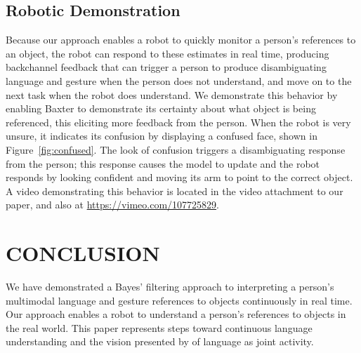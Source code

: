 \documentclass[graybox]{svmult}
\begin{document}
\subsection{Robotic Demonstration}

Because our approach enables a robot to quickly monitor a person's
references to an object, the robot can respond to these estimates in
real time, producing backchannel feedback that can trigger a person to
produce disambiguating language and gesture when the person does not
understand, and move on to the next task when the robot does
understand.  We demonstrate this behavior by enabling Baxter to
demonstrate its certainty about what object is being referenced, this
eliciting more feedback from the person.  When the robot is very
unsure, it indicates its confusion by displaying a confused face,
shown in Figure~\ref{fig:confused}.  The look of confusion triggers a
disambiguating response from the person; this response causes the
model to update and the robot responds by looking confident and moving
its arm to point to the correct object.  A video demonstrating this
behavior is located in the video attachment to our paper, and also at
\url{https://vimeo.com/107725829}.

\section{CONCLUSION}

We have demonstrated a Bayes' filtering approach to interpreting a
person's multimodal language and gesture references to objects
continuously in real time.  Our approach enables a robot to understand
a person's references to objects in the real world.  This paper
represents steps toward continuous language understanding and the
vision presented by \citet{clark96} of language as joint activity.
\end{document}
